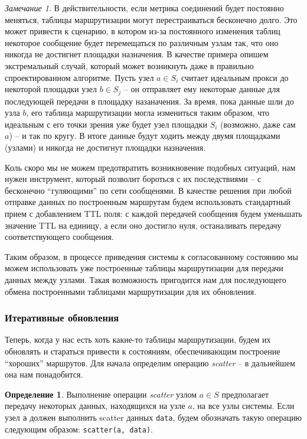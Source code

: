 \documentclass{article}
\theoremstyle{plain}
\theoremstyle{plain}
\theoremstyle{plain}
\theoremstyle{plain}
\theoremstyle{definition}
\newtheorem{definition}{Определение}[section]
\theoremstyle{remark}
\newtheorem{remark}{Замечание}[section]
\theoremstyle{plain}
\begin{document}
\begin{remark}
\label{InfinityLoops}
    В действительности, если метрика соединений будет постоянно меняться, таблицы маршрутизации могут перестраиваться бесконечно долго. Это может привести к сценарию, в котором из-за постоянного изменения таблиц некоторое сообщение будет перемещаться по различным узлам так, что оно никогда не достигнет площадки назначения. В качестве примера опишем экстремальный случай, который может возникнуть даже в правильно спроектированном алгоритме. Пусть узел $a \in S_i$ считает идеальным прокси до некоторой площадки узел $b \in S_j$ -- он отправляет ему некоторые данные для последующей передачи в площадку назаначения. За время, пока данные шли до узла $b$, его таблица маршрутизации могла измениться таким образом, что идеальным с его точки зрения уже будет узел площадки $S_i$ (возможно, даже сам $a$) -- и так по кругу. В итоге данные будут ходить между двумя площадками (узлами) и никогда не достигнут площадки назначения.
    
    Коль скоро мы не можем предотвратить возникновение подобных ситуаций, нам нужен инструмент, который позволит бороться с их последствиями -- с бесконечно \enquote{гуляющими} по сети сообщенями. В качестве решения при любой отправке данных по построенным маршрутам будем использовать стандартный \cite[стр.~2]{RFC0791} прием с добавлением TTL поля: с каждой передачей сообщения будем уменьшать значение TTL на единицу, а если оно достигло нуля, останаливать передачу соответствующего сообщения.
\end{remark}

Таким образом, в процессе приведения системы к согласованному состоянию мы можем использовать уже построенные таблицы маршрутизации для передачи данных между узлами. Такая возможность пригодится нам для последующего обмена построенными таблицами маршрутизации для их обновления.

\subsubsection{Итеративные обновления}
\label{IterativeUpdates}

Теперь, когда у нас есть хоть какие-то таблицы маршрутизации, будем их обновлять и стараться привести к состояниям, обеспечивающим построение \enquote{хороших} маршрутов. Для начала определим операцию \textit{scatter} -- в дальнейшем она нам понадобится.

\begin{definition}
\label{ScatterDefinition}
    Выполнение операции \textit{scatter} узлом $a \in S$ предполагает передачу некоторых данных, находящихся на узле $a$, на все узлы системы. Если узел \texttt{a} должен выполнить scatter данных \texttt{data}, будем обозначать такую операцию следующим образом: \texttt{scatter(a, data)}.
\end{definition}
\end{document}
